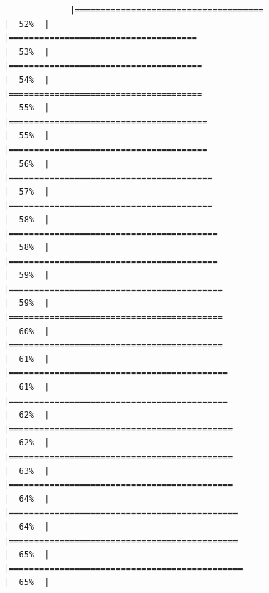 \documentclass[
]{article}
\begin{document}
\begin{verbatim}
             |=====================================                                 |  52%  |                                                                              |=====================================                                 |  53%  |                                                                              |======================================                                |  54%  |                                                                              |======================================                                |  55%  |                                                                              |=======================================                               |  55%  |                                                                              |=======================================                               |  56%  |                                                                              |========================================                              |  57%  |                                                                              |========================================                              |  58%  |                                                                              |=========================================                             |  58%  |                                                                              |=========================================                             |  59%  |                                                                              |==========================================                            |  59%  |                                                                              |==========================================                            |  60%  |                                                                              |==========================================                            |  61%  |                                                                              |===========================================                           |  61%  |                                                                              |===========================================                           |  62%  |                                                                              |============================================                          |  62%  |                                                                              |============================================                          |  63%  |                                                                              |============================================                          |  64%  |                                                                              |=============================================                         |  64%  |                                                                              |=============================================                         |  65%  |                                                                              |==============================================                        |  65%  |                                                                  
\end{verbatim}
\end{document}
